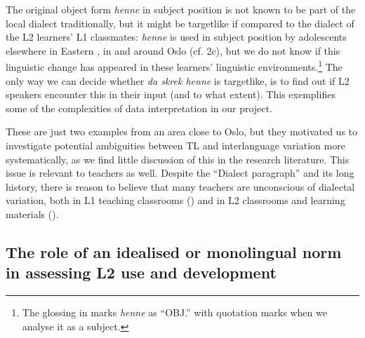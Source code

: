 \documentclass[output=paper,colorlinks,citecolor=brown,modfonts,nonflat]{../langscibook}
\begin{document}
The original object form \textit{henne} in subject position is not known to be part of the local dialect traditionally, but it might be targetlike if compared to the dialect of the L2 learners’ L1  classmates: \textit{henne} is used in subject position by adolescents elsewhere in Eastern , in and around Oslo (cf. 2c), but we do not know if this linguistic change has appeared in these learners’ linguistic environments.\footnote{{The glossing in  marks} {\textit{henne} }{as “OBJ.” with quotation marks when we analyse it as a subject.}} The only way we can decide whether \textit{da skrek henne}  is targetlike, is to find out if L2 speakers encounter this in their input (and to what extent). This exemplifies some of the complexities of data interpretation in our project.

These are just two examples from an area close to Oslo, but they motivated us to investigate potential ambiguities between TL and interlanguage variation more systematically, as we find little discussion of this in the research literature. This issue is relevant to teachers as well. Despite the ``Dialect paragraph'' and its long history, there is reason to believe that many teachers are unconscious of dialectal variation, \- both in L1 teaching classrooms (\citealt{Jahr1992, JanssonEtAl2017}) and in L2 classrooms and learning materials (\citealt{Husby2009, Heide2017}).

\subsection{The role of an idealised or monolingual norm in assessing L2 use and development}\label{sec:emilsen:2.2}
\end{document}
